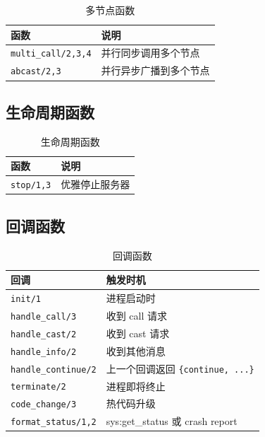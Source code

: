 \documentclass[a4paper,11pt]{article}
\begin{document}
\begin{table}[H]
\centering
\small
\begin{tabular}{@{}lp{7cm}@{}}
\toprule
\textbf{函数} & \textbf{说明} \\
\midrule
\texttt{multi\_call/2,3,4} & 并行同步调用多个节点 \\
\texttt{abcast/2,3} & 并行异步广播到多个节点 \\
\bottomrule
\end{tabular}
\caption{多节点函数}
\end{table}

\subsection{生命周期函数}

\begin{table}[H]
\centering
\small
\begin{tabular}{@{}lp{7cm}@{}}
\toprule
\textbf{函数} & \textbf{说明} \\
\midrule
\texttt{stop/1,3} & 优雅停止服务器 \\
\bottomrule
\end{tabular}
\caption{生命周期函数}
\end{table}

\subsection{回调函数}

\begin{table}[H]
\centering
\small
\begin{tabular}{@{}lp{7cm}@{}}
\toprule
\textbf{回调} & \textbf{触发时机} \\
\midrule
\texttt{init/1} & 进程启动时 \\
\texttt{handle\_call/3} & 收到 call 请求 \\
\texttt{handle\_cast/2} & 收到 cast 请求 \\
\texttt{handle\_info/2} & 收到其他消息 \\
\texttt{handle\_continue/2} & 上一个回调返回 \texttt{\{continue, ...\}} \\
\texttt{terminate/2} & 进程即将终止 \\
\texttt{code\_change/3} & 热代码升级 \\
\texttt{format\_status/1,2} & sys:get\_status 或 crash report \\
\bottomrule
\end{tabular}
\caption{回调函数}
\end{table}
\end{document}
